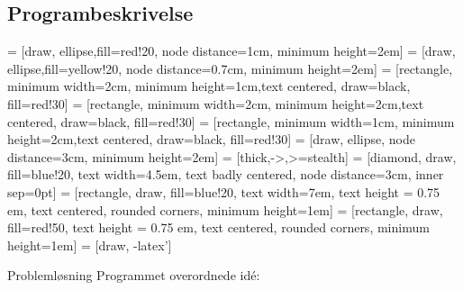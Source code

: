 \subsection{Programbeskrivelse}
\usetikzlibrary{arrows,calc,positioning}

 = [draw, ellipse,fill=red!20, node distance=1cm, minimum height=2em]
 = [draw, ellipse,fill=yellow!20, node distance=0.7cm, minimum height=2em]
 = [rectangle, minimum width=2cm, minimum height=1cm,text centered, draw=black, fill=red!30]
 = [rectangle, minimum width=2cm, minimum height=2cm,text centered, draw=black, fill=red!30]
 = [rectangle, minimum width=1cm, minimum height=2cm,text centered, draw=black, fill=red!30]
 = [draw, ellipse, node distance=3cm, minimum height=2em]
 = [thick,->,>=stealth]
 = [diamond, draw, fill=blue!20, text width=4.5em, text badly centered, node distance=3cm, inner sep=0pt]
 = [rectangle, draw, fill=blue!20, text width=7em, text height = 0.75 em, text centered, rounded corners, minimum height=1em]
 = [rectangle, draw, fill=red!50, text height = 0.75 em, text centered, rounded corners, minimum height=1em]
 = [draw, -latex']


\begin{frame}{Problemløsning}
    Programmet overordnede idé: \newline

\end{frame}
